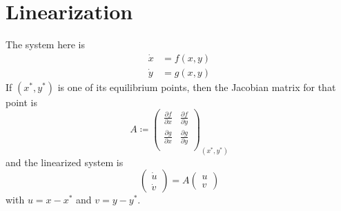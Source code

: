 \documentclass[12pt, openany]{report}
\theoremstyle{definition}
\begin{document}
\section{Linearization}
The system here is 
\begin{align}\label{eq:2D-CT}
    \dot x &= f(x,y)\nonumber \\
    \dot y &= g(x,y)
\end{align}
If \((x^*,y^*)\) is one of its equilibrium points, then the Jacobian matrix for that point is 
\begin{equation}
    A \coloneqq \begin{pmatrix}
        \frac{\partial f}{\partial x} & \frac{\partial f}{\partial y}\\
        \frac{\partial g}{\partial x} & \frac{\partial g}{\partial y}\\
    \end{pmatrix}_{(x^*,y^*)}
\end{equation}
and the linearized system is 
\begin{equation}
    \begin{pmatrix}
        \dot u\\ \dot v
    \end{pmatrix} = A \begin{pmatrix}
        u\\ v
    \end{pmatrix}
\end{equation}
with \(u=x-x^*\) and \(v=y-y^*\). 
\end{document}
